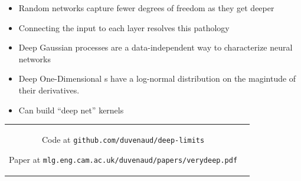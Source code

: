 \documentclass[portrait,a0b,final,a4resizeable]{include/a0poster}
\begin{document}
\begin{poster}
\begin{multicols}{2}
\begin{minipage}[c]{0.39\columnwidth}
\begin{centering}
\begin{tabular}{c}
\end{tabular}
\end{centering}
\end{minipage}








\begin{itemize}
	\item Random networks capture fewer degrees of freedom as they get deeper
	\item Connecting the input to each layer resolves this pathology
	\item Deep Gaussian processes are a data-independent way to characterize neural networks
	\item Deep One-Dimensional \gp{}s have a log-normal distribution on the magintude of their derivatives.
	\item Can build ``deep net'' kernels
\end{itemize}


\raggedright

\begin{tabular}{cc}
\begin{minipage}[c]{0.8\columnwidth}

Code at \texttt{github.com/duvenaud/deep-limits}

Paper at \texttt{mlg.eng.cam.ac.uk/duvenaud/papers/verydeep.pdf}


\end{minipage}
\end{tabular}
\end{multicols}
\end{poster}
\end{document}
